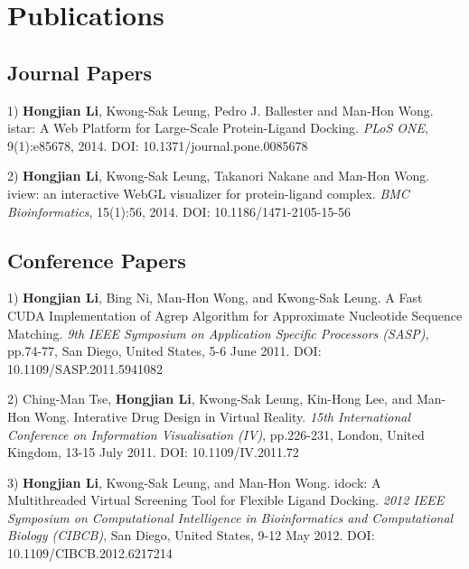 \chapter{Publications}

\section{Journal Papers}

1) \textbf{Hongjian Li}, Kwong-Sak Leung, Pedro J. Ballester and Man-Hon Wong. istar: A Web Platform for Large-Scale Protein-Ligand Docking. \textit{PLoS ONE}, 9(1):e85678, 2014. DOI: 10.1371/journal.pone.0085678

2) \textbf{Hongjian Li}, Kwong-Sak Leung, Takanori Nakane and Man-Hon Wong. iview: an interactive WebGL visualizer for protein-ligand complex. \textit{BMC Bioinformatics}, 15(1):56, 2014. DOI: 10.1186/1471-2105-15-56

\section{Conference Papers}

1) \textbf{Hongjian Li}, Bing Ni, Man-Hon Wong, and Kwong-Sak Leung. A Fast CUDA Implementation of Agrep Algorithm for Approximate Nucleotide Sequence Matching. \textit{9th IEEE Symposium on Application Specific Processors (SASP)}, pp.74-77, San Diego, United States, 5-6 June 2011. DOI: 10.1109/SASP.2011.5941082

2) Ching-Man Tse, \textbf{Hongjian Li}, Kwong-Sak Leung, Kin-Hong Lee, and Man-Hon Wong. Interative Drug Design in Virtual Reality. \textit{15th International Conference on Information Visualisation (IV)}, pp.226-231, London, United Kingdom, 13-15 July 2011. DOI: 10.1109/IV.2011.72

3) \textbf{Hongjian Li}, Kwong-Sak Leung, and Man-Hon Wong. idock: A Multithreaded Virtual Screening Tool for Flexible Ligand Docking. \textit{2012 IEEE Symposium on Computational Intelligence in Bioinformatics and Computational Biology (CIBCB)}, San Diego, United States, 9-12 May 2012. DOI: 10.1109/CIBCB.2012.6217214

\chapterend
